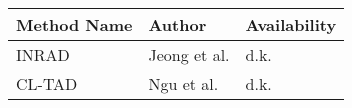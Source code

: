 \begin{longtable}[]{@{}lll@{}}
\toprule\noalign{}
Method Name & Author & Availability \\
\midrule\noalign{}
\endhead
\bottomrule\noalign{}
\endlastfoot
INRAD & Jeong et al. & d.k. \\
CL-TAD & Ngu et al. & d.k. \\
\end{longtable}
